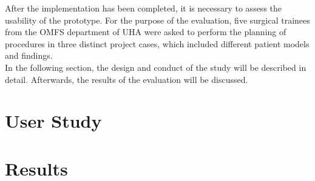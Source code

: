 After the implementation has been completed, it is necessary to assess the usability of the prototype.
For the purpose of the evaluation, five surgical trainees from the
OMFS department of UHA were asked to perform the planning of procedures 
in three distinct project cases, which included different patient models 
and findings.
\\ In the following section, the design and conduct of the study will be described in detail.
Afterwards, the results of the evaluation will be discussed. 

\section{\label{sec::Methology}User Study}

\section{\label{sec::Results}Results}
